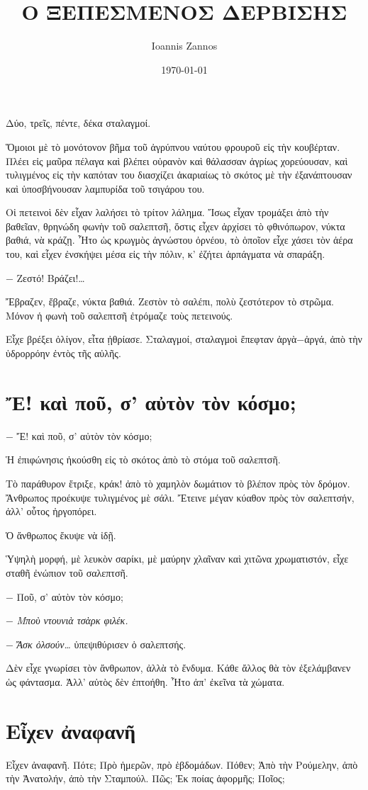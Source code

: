 \documentclass[11pt]{article}
\author{Ioannis Zannos}
\date{\today}
\title{Ο ΞΕΠΕΣΜΕΝΟΣ ΔΕΡΒΙΣΗΣ}
\begin{document}
\maketitle
\tableofcontents

Δύο, τρεῖς, πέντε, δέκα σταλαγμοί.

Ὅμοιοι μὲ τὸ μονότονον βῆμα τοῦ ἀγρύπνου ναύτου φρουροῦ εἰς τὴν κουβέρταν. Πλέει εἰς μαῦρα πέλαγα καὶ βλέπει οὐρανὸν καὶ θάλασσαν ἀγρίως χορεύουσαν, καὶ τυλιγμένος εἰς τὴν καπόταν του διασχίζει ἀκαριαίως τὸ σκότος μὲ τὴν ἐξανάπτουσαν καὶ ὑποσβήνουσαν λαμπυρίδα τοῦ τσιγάρου του.

Οἱ πετεινοὶ δὲν εἶχαν λαλήσει τὸ τρίτον λάλημα. Ἴσως εἶχαν τρομάξει ἀπὸ τὴν βαθεῖαν, θρηνώδη φωνὴν τοῦ σαλεπτσῆ, ὅστις εἶχεν ἀρχίσει τὸ φθινόπωρον, νύκτα βαθιά, νὰ κράζῃ. Ἦτο ὡς κρωγμὸς ἀγνώστου ὀρνέου, τὸ ὁποῖον εἶχε χάσει τὸν ἀέρα του, καὶ εἶχεν ἐνσκήψει μέσα εἰς τὴν πόλιν, κ' ἐζήτει ἁρπάγματα νὰ σπαράξη.

− Ζεστό! Βράζει!…

Ἔβραζεν, ἔβραζε, νύκτα βαθιά. Ζεστὸν τὸ σαλέπι, πολὺ ζεστότερον τὸ στρῶμα. Μόνον ἡ φωνὴ τοῦ σαλεπτσῆ ἐτρόμαζε τοὺς πετεινούς.

Εἶχε βρέξει ὀλίγον, εἶτα ᾐθρίασε. Σταλαγμοί, σταλαγμοὶ ἔπεφταν ἀργὰ−ἀργά, ἀπὸ τὴν ὑδρορρόην ἐντὸς τῆς αὐλῆς.

\section{Ἔ! καὶ ποῦ, σ' αὐτὸν τὸν κόσμο;}
\label{sec:org76ab8b4}
− Ἔ! καὶ ποῦ, σ' αὐτὸν τὸν κόσμο;

Ἡ ἐπιφώνησις ἠκούσθη εἰς τὸ σκότος ἀπὸ τὸ στόμα τοῦ σαλεπτσῆ.

Τὸ παράθυρον ἔτριξε, κράκ! ἀπὸ τὸ χαμηλὸν δωμάτιον τὸ βλέπον πρὸς τὸν δρόμον. Ἄνθρωπος προέκυψε τυλιγμένος μὲ σάλι. Ἔτεινε μέγαν κύαθον πρὸς τὸν σαλεπτσήν, ἀλλ' οὗτος ἠργοπόρει.

Ὁ ἄνθρωπος ἔκυψε νὰ ἰδῇ.

Ὑψηλὴ μορφή, μὲ λευκὸν σαρίκι, μὲ μαύρην χλαῖναν καὶ χιτῶνα χρωματιστόν, εἶχε σταθῆ ἐνώπιον τοῦ σαλεπτσῆ.

− Ποῦ, σ' αὐτὸν τὸν κόσμο;

− \emph{Μποὺ ντουνιὰ τσὰρκ φιλέκ.}

− \emph{Ἄσκ ὀλσούν…} ὑπεψιθύρισεν ὁ σαλεπτσής.

Δὲν εἶχε γνωρίσει τὸν ἄνθρωπον, ἀλλὰ τὸ ἔνδυμα. Κάθε ἄλλος θὰ τὸν ἐξελάμβανεν ὡς φάντασμα. Ἀλλ' αὐτὸς δὲν ἐπτοήθη. Ἦτο ἀπ' ἐκεῖνα τὰ χώματα.
\section{Εἶχεν ἀναφανῆ}
\label{sec:orga42ba2c}
Εἶχεν ἀναφανῆ. Πότε; Πρὸ ἡμερῶν, πρὸ ἑβδομάδων. Πόθεν; Ἀπὸ τὴν Ρούμελην, ἀπὸ τὴν Ἀνατολήν, ἀπὸ τὴν Σταμπούλ. Πῶς; Ἐκ ποίας ἀφορμῆς; Ποῖος;
\end{document}
